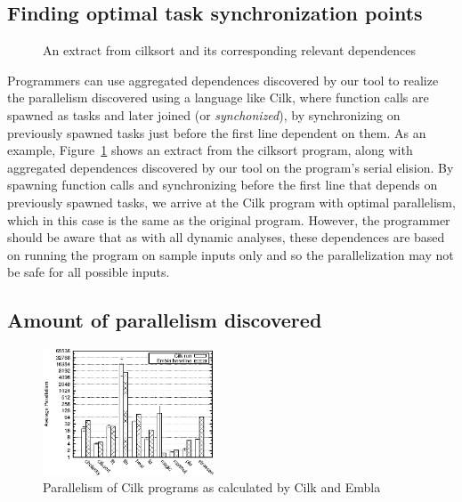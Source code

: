 \subsection{Finding optimal task synchronization points} \label{sresults:cilk-spawns}
\begin{figure}[t]
  \begin{center}
  \scriptsize
  
  \end{center}
  \caption{An extract from \textsf{cilksort} and its corresponding relevant dependences}
  \label{cilksort-depgraph}
\end{figure}

Programmers can use aggregated dependences discovered by our tool to realize the parallelism discovered using a language like Cilk,
where function calls are spawned as tasks and later joined (or \emph{synchonized}),
by synchronizing on previously spawned tasks just before the first line dependent on them.
As an example, Figure~\ref{cilksort-depgraph} shows an extract from the \textsf{cilksort} program,
along with aggregated dependences discovered by our tool on the program's serial elision.
By spawning function calls and synchronizing before the first line that depends on previously spawned tasks,
we arrive at the Cilk program with optimal parallelism, which in this case is the same as the original program.
However, the programmer should be aware that as with all dynamic analyses, these dependences are based on running the program on sample inputs only and so the parallelization may not be safe for all possible inputs.

\subsection{Amount of parallelism discovered} \label{sresults:cilk-limits}
\begin{figure}
 \centering
 \includegraphics[width=2.0in]{cilk-run}
 \caption{Parallelism of Cilk programs as calculated by Cilk and Embla}
 \label{cilk-run}
\end{figure}

